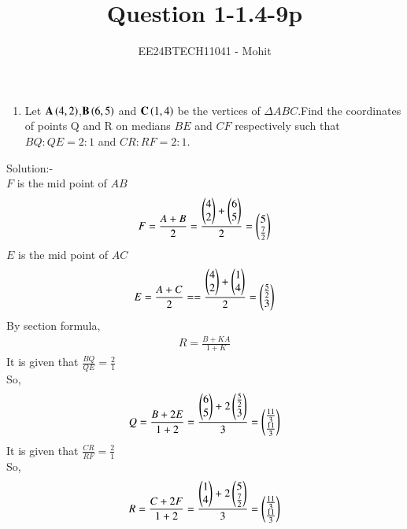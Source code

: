 \documentclass[journal]{IEEEtran}
\numberwithin{equation}{enumi}
\numberwithin{figure}{enumi}
\begin{document}

\title{Question 1-1.4-9p}
\author{EE24BTECH11041 - Mohit}
{\let\newpage\relax\maketitle}
\begin{enumerate}
	\item Let $\mathbf{A}\left(4,2\right)$,$\mathbf{B}\left(6,5\right)$ and $\mathbf{C}\left(1,4\right)$ be the vertices of $\Delta$$ABC$.Find the coordinates of points Q and R on medians $BE$ and $CF$ respectively such that $BQ:QE=2:1$ and $CR:RF=2:1$.
\end{enumerate}
Solution:-\\
$F$ is the mid point of $AB$\\
\begin{align*}
F=\frac{A+B}{2}=\frac{\begin{pmatrix}4\\2\end{pmatrix} + \begin{pmatrix}6\\5\end{pmatrix}}{2}
=\begin{pmatrix}5\\ \frac{7}{2}\end{pmatrix}
\end{align*}
$E$ is the mid point of $AC$\\
\begin{align*}
E=\frac{A+C}{2}==\frac{\begin{pmatrix}4\\2\end{pmatrix} + \begin{pmatrix}1\\4\end{pmatrix}}{2}
=\begin{pmatrix}\frac{5}{2}\\3\end{pmatrix}
\end{align*}
By section formula,
\begin{align*}
    R=\frac{B+KA}{1+K}
\end{align*}
It is given that $\frac{BQ}{QE}=\frac{2}{1}$\\
So,\\
\begin{align*}
    Q=\frac{B+2E}{1+2}=\frac{\begin{pmatrix}6\\5\end{pmatrix} + 2\begin{pmatrix}\frac{5}{2}\\3\end{pmatrix}}{3}=\begin{pmatrix}\frac{11}{3}\\ \frac{11}{3}\end{pmatrix}
\end{align*}
It is given that $\frac{CR}{RF}=\frac{2}{1}$\\
So,\\
\begin{align*}
    R=\frac{C+2F}{1+2}=\frac{\begin{pmatrix}1\\4\end{pmatrix} + 2\begin{pmatrix}5\\\frac{7}{2}\end{pmatrix}}{3}=\begin{pmatrix}\frac{11}{3}\\ \frac{11}{3}\end{pmatrix}
\end{align*}
\end{document}
